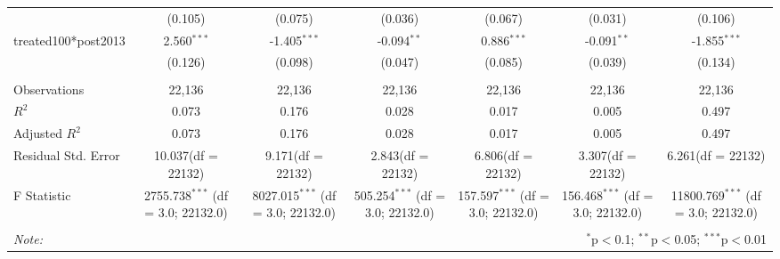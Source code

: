 \documentclass[12pt]{article}
\begin{document}
\begin{table}[!htbp]
\begin{tabular}{@{\extracolsep{5pt}}lcccccc}
  & (0.105) & (0.075) & (0.036) & (0.067) & (0.031) & (0.106) \\
 treated100*post2013 & 2.560$^{***}$ & -1.405$^{***}$ & -0.094$^{**}$ & 0.886$^{***}$ & -0.091$^{**}$ & -1.855$^{***}$ \\
  & (0.126) & (0.098) & (0.047) & (0.085) & (0.039) & (0.134) \\
\hline \\[-1.8ex]
 Observations & 22,136 & 22,136 & 22,136 & 22,136 & 22,136 & 22,136 \\
 $R^2$ & 0.073 & 0.176 & 0.028 & 0.017 & 0.005 & 0.497 \\
 Adjusted $R^2$ & 0.073 & 0.176 & 0.028 & 0.017 & 0.005 & 0.497 \\
 Residual Std. Error & 10.037(df = 22132) & 9.171(df = 22132) & 2.843(df = 22132) & 6.806(df = 22132) & 3.307(df = 22132) & 6.261(df = 22132)  \\
 F Statistic & 2755.738$^{***}$ (df = 3.0; 22132.0) & 8027.015$^{***}$ (df = 3.0; 22132.0) & 505.254$^{***}$ (df = 3.0; 22132.0) & 157.597$^{***}$ (df = 3.0; 22132.0) & 156.468$^{***}$ (df = 3.0; 22132.0) & 11800.769$^{***}$ (df = 3.0; 22132.0) \\
\hline
\hline \\[-1.8ex]
\textit{Note:} & \multicolumn{6}{r}{$^{*}$p$<$0.1; $^{**}$p$<$0.05; $^{***}$p$<$0.01} \\
\end{tabular}
\end{table}
\end{document}
